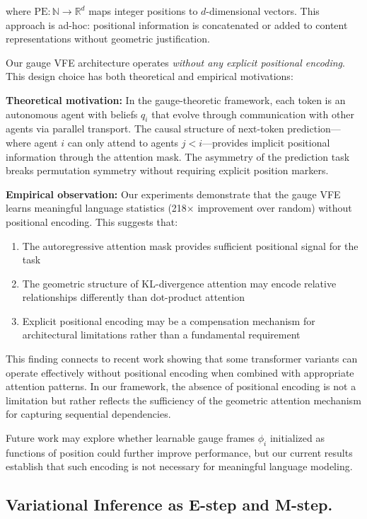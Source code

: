 \documentclass[twoside,11pt]{article}
\begin{document}
where $\text{PE}: \mathbb{N} \to \mathbb{R}^d$ maps integer positions to $d$-dimensional vectors. This approach is ad-hoc: positional information is concatenated or added to content representations without geometric justification.

Our gauge VFE architecture operates \emph{without any explicit positional encoding}. This design choice has both theoretical and empirical motivations:

\textbf{Theoretical motivation:} In the gauge-theoretic framework, each token is an autonomous agent with beliefs $q_i$ that evolve through communication with other agents via parallel transport. The causal structure of next-token prediction---where agent $i$ can only attend to agents $j < i$---provides implicit positional information through the attention mask. The asymmetry of the prediction task breaks permutation symmetry without requiring explicit position markers.

\textbf{Empirical observation:} Our experiments demonstrate that the gauge VFE learns meaningful language statistics (218$\times$ improvement over random) without positional encoding. This suggests that:
\begin{enumerate}
    \item The autoregressive attention mask provides sufficient positional signal for the task
    \item The geometric structure of KL-divergence attention may encode relative relationships differently than dot-product attention
    \item Explicit positional encoding may be a compensation mechanism for architectural limitations rather than a fundamental requirement
\end{enumerate}

This finding connects to recent work showing that some transformer variants can operate effectively without positional encoding when combined with appropriate attention patterns. In our framework, the absence of positional encoding is not a limitation but rather reflects the sufficiency of the geometric attention mechanism for capturing sequential dependencies.

Future work may explore whether learnable gauge frames $\phi_i$ initialized as functions of position could further improve performance, but our current results establish that such encoding is not necessary for meaningful language modeling.

\subsection{Variational Inference as E-step and M-step.}
\end{document}
